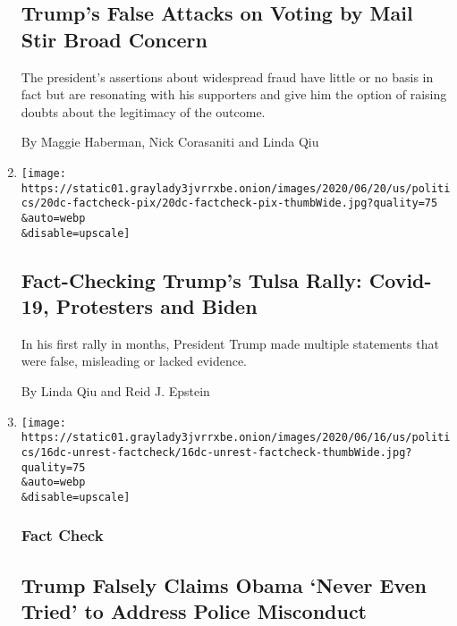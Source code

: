 \begin{enumerate}
  \hypertarget{trumps-false-attacks-on-voting-by-mail-stir-broad-concern}{%
  \subsection{Trump's False Attacks on Voting by Mail Stir Broad
  Concern}\label{trumps-false-attacks-on-voting-by-mail-stir-broad-concern}}

  The president's assertions about widespread fraud have little or no
  basis in fact but are resonating with his supporters and give him the
  option of raising doubts about the legitimacy of the outcome.

  By Maggie Haberman, Nick Corasaniti and Linda Qiu
\item
  \href{/2020/06/20/us/politics/trump-factcheck-tulsa-rally.html}{}

  \texttt{[image: https://static01.graylady3jvrrxbe.onion/images/2020/06/20/us/politics/20dc-factcheck-pix/20dc-factcheck-pix-thumbWide.jpg?quality=75\\\&auto=webp\\\&disable=upscale]}

  \hypertarget{fact-checking-trumps-tulsa-rally-covid-19-protesters-and-biden}{%
  \subsection{Fact-Checking Trump's Tulsa Rally: Covid-19, Protesters
  and
  Biden}\label{fact-checking-trumps-tulsa-rally-covid-19-protesters-and-biden}}

  In his first rally in months, President Trump made multiple statements
  that were false, misleading or lacked evidence.

  By Linda Qiu and Reid J. Epstein
\item
  \href{/2020/06/16/us/politics/trump-obama-police-misconduct-fact-check.html}{}

  \texttt{[image: https://static01.graylady3jvrrxbe.onion/images/2020/06/16/us/politics/16dc-unrest-factcheck/16dc-unrest-factcheck-thumbWide.jpg?quality=75\\\&auto=webp\\\&disable=upscale]}

  \hypertarget{fact-check-5}{%
  \subsubsection{Fact Check}\label{fact-check-5}}

  \hypertarget{trump-falsely-claims-obama-never-even-tried-to-address-police-misconduct}{%
  \subsection{Trump Falsely Claims Obama `Never Even Tried' to Address
  Police
  Misconduct}\label{trump-falsely-claims-obama-never-even-tried-to-address-police-misconduct}}


\end{enumerate}
